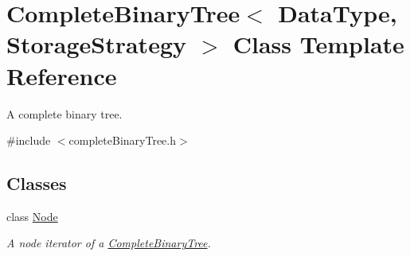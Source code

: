 \hypertarget{class_complete_binary_tree}{
\section{CompleteBinaryTree$<$ DataType, StorageStrategy $>$ Class Template Reference}
\label{class_complete_binary_tree}
}


A complete binary tree.  




{\ttfamily \#include $<$completeBinaryTree.h$>$}

\subsection*{Classes}
\begin{DoxyCompactItemize}
\item 
class \hyperlink{class_complete_binary_tree_1_1_node}{Node}
\begin{DoxyCompactList}\small\item\em A node iterator of a \hyperlink{class_complete_binary_tree}{CompleteBinaryTree}. \item\end{DoxyCompactList}\end{DoxyCompactItemize}
